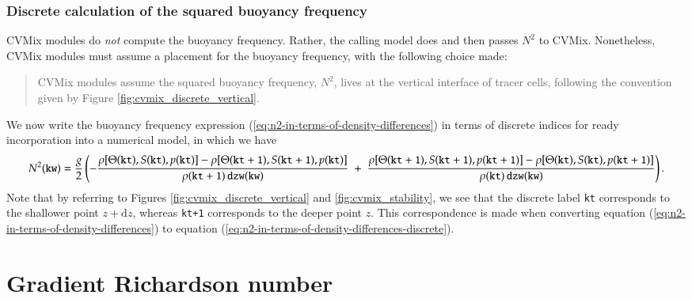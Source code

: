 \subsubsection{Discrete calculation of the squared buoyancy frequency}
\label{subsubsection:numerics-buoyancy-frequency}

CVMix modules do {\it not} compute the buoyancy frequency.  Rather,
the calling model does and then passes $N^{2}$ to CVMix. Nonetheless,
CVMix modules must assume a placement for the buoyancy frequency, with
the following choice made:
\begin{quote}
  {\sf CVMix modules assume the squared buoyancy frequency, $N^{2}$,
      lives at the vertical interface of tracer cells, following the
      convention given by Figure \ref{fig:cvmix_discrete_vertical}.}
\end{quote}
We now write the buoyancy frequency expression
(\ref{eq:n2-in-terms-of-density-differences}) in terms of discrete
indices for ready incorporation into a numerical model, in which we have 
\small
\begin{equation}
N^{2}({\tt kw}) = 
 \frac{g}{2} 
  \left( 
 -\frac{
    \rho[ \Theta( {\tt kt}), S( {\tt kt}), p( {\tt kt})]
  -\rho[ \Theta( {\tt kt+1} ), S({\tt kt +1} ), p( {\tt kt} )]
  }{\rho({\tt kt+1} ) \,  {\tt dzw(kw)} }
 \; +  \; 
 \frac{ \rho[ \Theta({\tt kt+1}), S({\tt kt+1}), p({\tt kt+1})]-
 \rho[ \Theta({\tt kt} ), S( {\tt kt}), p({\tt kt+1})]
  }{\rho( {\tt kt}) \, {\tt dzw(kw)}  }
 \right).
\label{eq:n2-in-terms-of-density-differences-discrete}
\end{equation}
\normalsize Note that by referring to Figures
\ref{fig:cvmix_discrete_vertical} and \ref{fig:cvmix_stability}, we
see that the discrete label {\tt kt} corresponds to the shallower
point $z+\mathrm{d}z$, whereas {\tt kt+1} corresponds to the deeper
point $z$.  This correspondence is made when converting equation
(\ref{eq:n2-in-terms-of-density-differences}) to
equation (\ref{eq:n2-in-terms-of-density-differences-discrete}).


\section{Gradient Richardson number}
\label{section:gradient-richardson-number-elements}

